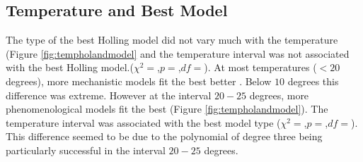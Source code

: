 \documentclass{article}
\begin{document}
\subsection{Temperature and Best Model}
The type of the best Holling model did not vary much with the temperature (Figure \ref{fig:tempholandmodel} and the temperature interval was not associated with the best Holling model.($\chi^2=$,$p=$,$df=$). At most temperatures ($<20$ degrees), more mechanistic models fit the best better . Below $10$ degrees this difference was extreme. However at the interval $20-25$ degrees, more phenomenological models fit the best (Figure \ref{fig:tempholandmodel}).  The temperature interval was associated with the best model type ($\chi^2=$,$p=$,$df=$). This difference seemed to be due to the polynomial of degree three being particularly successful in the interval $20-25$ degrees.
\end{document}
